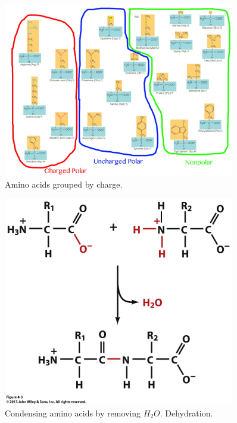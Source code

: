 \documentclass[]{article}
\begin{document}
\begin{figure}[H]
	\caption{Amino acids grouped by charge.}\label{fig:AminoAcidsGrouped} 
	\includegraphics[width=0.9\textwidth]{AminoAcidsGrouped}
\end{figure}

\begin{figure}[H]
	\caption{Condensing amino acids by removing $H_2O$. Dehydration.}\label{fig:AminoAcidsCondensed} 
	\includegraphics[width=0.9\textwidth]{AminoAcidsCondensed}
\end{figure}
\end{document}
